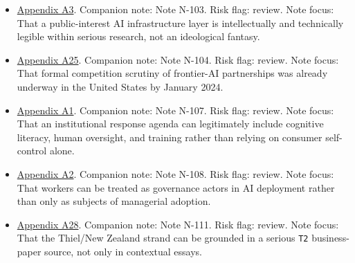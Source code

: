 \documentclass[
  american,
  11pt,
  letterpaper,
]{article}
\begin{document}
\begin{itemize}
  \hyperref[appendix-a27-inside-mark-zuckerbergs-top-secret-hawaii-compound]{Appendix
  A27}. Companion note: Note N-097. Risk flag: review. Note focus: That
  a serious \texttt{T2} investigation documented bunker-like features,
  strong secrecy controls, and private redundancy architecture at
  Zuckerberg's Kauai compound by December 2023.
\item
  \hyperref[appendix-a3-interactions-between-artificial-intelligence-and-digital-public-infrastructure-concepts-benefits-and-challenges]{Appendix
  A3}. Companion note: Note N-103. Risk flag: review. Note focus: That a
  public-interest AI infrastructure layer is intellectually and
  technically legible within serious research, not an ideological
  fantasy.
\item
  \hyperref[appendix-a25-ftc-opens-inquiry-into-big-tech-s-partnerships-with-leading-ai-startups]{Appendix
  A25}. Companion note: Note N-104. Risk flag: review. Note focus: That
  formal competition scrutiny of frontier-AI partnerships was already
  underway in the United States by January 2024.
\item
  \hyperref[appendix-a1-artificial-intelligence-and-the-future-of-teaching-and-learning-insights-and-recommendations]{Appendix
  A1}. Companion note: Note N-107. Risk flag: review. Note focus: That
  an institutional response agenda can legitimately include cognitive
  literacy, human oversight, and training rather than relying on
  consumer self-control alone.
\item
  \hyperref[appendix-a2-in-oxford-handbook-on-ai-governance-the-role-of-workers-in-ai-ethics-and-governance]{Appendix
  A2}. Companion note: Note N-108. Risk flag: review. Note focus: That
  workers can be treated as governance actors in AI deployment rather
  than only as subjects of managerial adoption.
\item
  \hyperref[appendix-a28-new-zealand-woos-the-wealthy-with-golden-visa-changes]{Appendix
  A28}. Companion note: Note N-111. Risk flag: review. Note focus: That
  the Thiel/New Zealand strand can be grounded in a serious \texttt{T2}
  business-paper source, not only in contextual essays.
\end{itemize}
\end{document}
